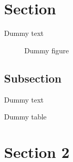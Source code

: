 \documentclass{article}
\begin{document}
	\doublespacing
	\tableofcontents
	\singlespacing
	\newpage
	
	\section{Section}
	
	Dummy text
	
	\begin{figure}[h!]
		\caption{Dummy figure}
	\end{figure}
	
	\newpage
	\subsection{Subsection}
	Dummy text
		\begin{table}[h!]
			\caption{Dummy table}
		\end{table}

	\section{Section 2}
	
	\newpage
	
		\listoffigures
		\listoftables
\end{document}
